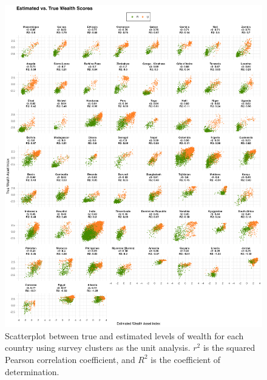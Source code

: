 \documentclass{article}
\begin{document}
\begin{figure}[H]
    \centering
    \includegraphics[width=1\textwidth]{figures/r2_scatter_eachcountry.png}
    \caption{Scatterplot between true and estimated levels of wealth for each country using survey clusters as the unit analysis. $r^2$ is the squared Pearson correlation coefficient, and $R^2$ is the coefficient of determination.}
     \label{fig:r2_scatter_eachcountry}
\end{figure}
\end{document}
